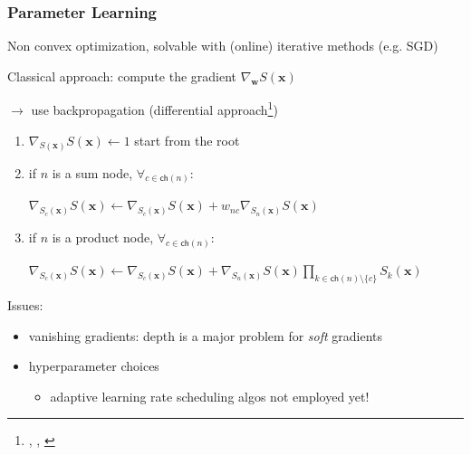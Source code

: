 \documentclass[10pt, t, xcolor={usenames,dvipsnames,svgnames}, compress]{beamer}
\newcommand{\customcite}[1]{\footnote{\scriptsize \citeauthor{#1}, \citetitle{#1}, \citeyear{#1}}}
\begin{document}
\begin{frame}
  \frametitle{Parameter Learning}
  Non convex optimization, solvable with (online) iterative methods
  (e.g. SGD)\par\bigskip

  Classical approach: compute the gradient $\nabla_{\mathbf{w}}
  S(\mathbf{x})$\par
  $\rightarrow$ use backpropagation (differential
  approach\customcite{Darwiche2003})\par
  \begin{enumerate}
  \item $\nabla_{S(\mathbf{x})} S(\mathbf{x})\leftarrow 1$ start from
    the root
  \item if $n$ is a sum node, $\forall_{c\in\mathsf{ch}(n)}$:\par
    $\nabla_{S_{c}(\mathbf{x})}S(\mathbf{x})\leftarrow
    \nabla_{S_{c}(\mathbf{x})}S(\mathbf{x}) + w_{nc}\nabla_{S_{n}(\mathbf{x})}S(\mathbf{x})$ 
  \item if $n$ is a product node, $\forall_{c\in\mathsf{ch}(n)}$:\par
    $\nabla_{S_{c}(\mathbf{x})}S(\mathbf{x})\leftarrow
    \nabla_{S_{c}(\mathbf{x})}S(\mathbf{x}) + \nabla_{S_{n}(\mathbf{x})}S(\mathbf{x})\prod_{k\in\mathsf{ch}(n)\setminus\{c\}}S_{k}(\mathbf{x})$
  \end{enumerate}
  \par%


  Issues:
  \begin{itemize}
  \item vanishing gradients: depth is a major problem for \emph{soft} gradients
  \item hyperparameter choices
    \begin{itemize}
    \item adaptive learning rate scheduling algos not employed yet!
    \end{itemize}
  \end{itemize}
\end{frame}
\end{document}
